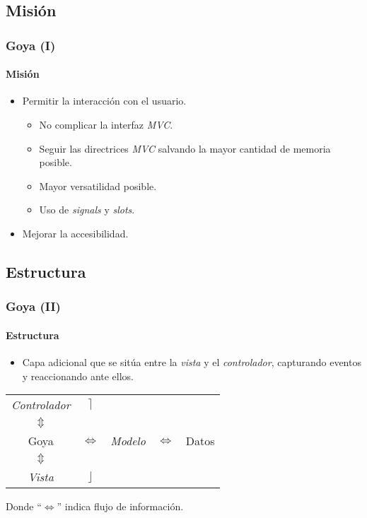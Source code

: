 \documentclass[12pt]{beamer}
\begin{document}
\subsection{Misión}
\begin{frame}
  \frametitle{Goya (I)}
  \framesubtitle{Misión}

  \begin{block}{}
    \begin{itemize}
      \item Permitir la interacción con el usuario.
      \begin{itemize}
        \item No complicar la interfaz \emph{MVC}.
        \medskip
        \pause
        \item Seguir las directrices \emph{MVC} salvando la mayor cantidad de memoria posible.
        \medskip
        \pause
        \item Mayor versatilidad posible.
        \medskip
        \pause
        \item Uso de \emph{signals} y \emph{slots}.
      \end{itemize}
      \medskip
      \pause
      \item Mejorar la accesibilidad.
    \end{itemize}
  \end{block}

\end{frame}

\subsection{Estructura}
\begin{frame}
  \frametitle{Goya (II)}
  \framesubtitle{Estructura}

  \begin{block}{}
    \begin{itemize}
      \item Capa adicional que se sitúa entre la \emph{vista} y el \emph{controlador}, capturando eventos y reaccionando ante ellos.
    \end{itemize}
    \medskip
    \pause
    \begin{center}
      \begin{tabular}{c c c c c}
        \emph{Controlador} & \textcolor{oxygenorange}{$\rceil$} \\
        \textcolor{oxygenorange}{$\Updownarrow$} \\
        Goya & \textcolor{oxygenorange}{$\Leftrightarrow$} & \emph{Modelo} & \textcolor{oxygenorange}{$\Leftrightarrow$} & Datos\\
        \textcolor{oxygenorange}{$\Updownarrow$} \\
        \emph{Vista} & \textcolor{oxygenorange}{$\rfloor$}
      \end{tabular}
    \end{center}
    \begin{tiny}\begin{center}Donde ``\textcolor{oxygenorange}{$\Leftrightarrow$}'' indica flujo de información.\end{center}\end{tiny}
  \end{block}
\end{frame}
\end{document}
